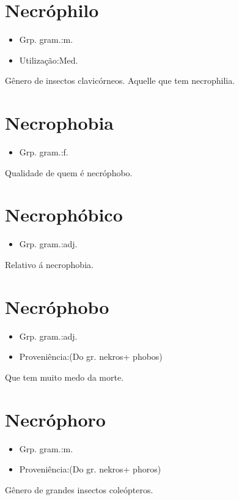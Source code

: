 \section{Necróphilo}
\begin{itemize}
\item {Grp. gram.:m.}
\end{itemize}
\begin{itemize}
\item {Utilização:Med.}
\end{itemize}
Gênero de insectos clavicórneos.
Aquelle que tem necrophilia.
\section{Necrophobia}
\begin{itemize}
\item {Grp. gram.:f.}
\end{itemize}
Qualidade de quem é necróphobo.
\section{Necrophóbico}
\begin{itemize}
\item {Grp. gram.:adj.}
\end{itemize}
Relativo á necrophobia.
\section{Necróphobo}
\begin{itemize}
\item {Grp. gram.:adj.}
\end{itemize}
\begin{itemize}
\item {Proveniência:(Do gr. \textunderscore nekros\textunderscore  + \textunderscore phobos\textunderscore )}
\end{itemize}
Que tem muito medo da morte.
\section{Necróphoro}
\begin{itemize}
\item {Grp. gram.:m.}
\end{itemize}
\begin{itemize}
\item {Proveniência:(Do gr. \textunderscore nekros\textunderscore  + \textunderscore phoros\textunderscore )}
\end{itemize}
Gênero de grandes insectos coleópteros.
